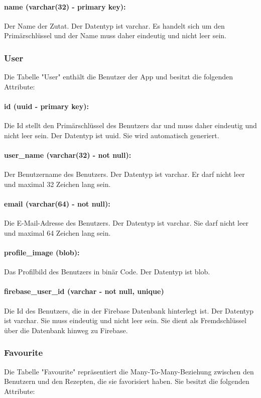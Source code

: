 \documentclass[parskip=full]{scrartcl}
\begin{document}
\paragraph{name (varchar(32) - primary key):} Der Name der Zutat. Der Datentyp ist \Gls{varchar}. Es handelt sich um den Primärschlüssel und der Name muss daher eindeutig und nicht leer sein.
\newpage
\subsubsection{User}
Die Tabelle "User" enthält die Benutzer der App und besitzt die folgenden Attribute:
\paragraph{id (uuid - primary key):} Die Id stellt den Primärschlüssel des Benutzers dar und muss daher eindeutig und nicht leer sein. Der Datentyp ist \Gls{uuid}. Sie wird automatisch generiert.
\paragraph{user\_name (varchar(32) - not null):} Der Benutzername des Benutzers. Der Datentyp ist \Gls{varchar}. Er darf nicht leer und maximal 32 Zeichen lang sein.
\paragraph{email (varchar(64) - not null):} Die E-Mail-Adresse des Benutzers. Der Datentyp ist \Gls{varchar}. Sie darf nicht leer und maximal 64 Zeichen lang sein.
\paragraph{profile\_image (blob):} Das Profilbild des Benutzers in binär Code. Der Datentyp ist \Gls{blob}.
\paragraph{firebase\_user\_id (varchar - not null, unique)} Die Id des Benutzers, die in der Firebase Datenbank hinterlegt ist. Der Datentyp ist \Gls{varchar}. Sie muss eindeutig und nicht leer sein. Sie dient als Fremdschlüssel über die Datenbank hinweg zu Firebase.
\newpage
\subsubsection{Favourite}
Die Tabelle "Favourite" repräsentiert die Many-To-Many-Beziehung zwischen den Benutzern und den Rezepten, die sie favorisiert haben. Sie besitzt die folgenden Attribute:
\end{document}
